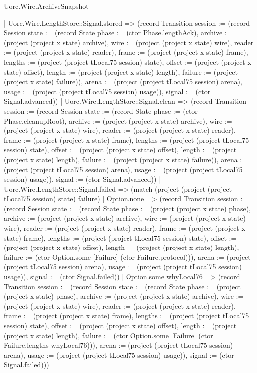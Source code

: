 \begin{lexlean}{Uorc.Wire.ArchiveSnapshot}
\begin{semanticmodule}
{        | Uorc.Wire.LengthStore::Signal.stored => (record Transition {session := (record Session {state := (record State {phase := (ctor Phase.lengthAck), archive := (project (project x state) archive), wire := (project (project x state) wire), reader := (project (project x state) reader), frame := (project (project x state) frame), lengths := (project (project tLocal75 session) state), offset := (project (project x state) offset), length := (project (project x state) length), failure := (project (project x state) failure)}), arena := (project (project tLocal75 session) arena), usage := (project (project tLocal75 session) usage)}), signal := (ctor Signal.advanced)})
        | Uorc.Wire.LengthStore::Signal.clean => (record Transition {session := (record Session {state := (record State {phase := (ctor Phase.cleanupRoot), archive := (project (project x state) archive), wire := (project (project x state) wire), reader := (project (project x state) reader), frame := (project (project x state) frame), lengths := (project (project tLocal75 session) state), offset := (project (project x state) offset), length := (project (project x state) length), failure := (project (project x state) failure)}), arena := (project (project tLocal75 session) arena), usage := (project (project tLocal75 session) usage)}), signal := (ctor Signal.advanced)})
        | Uorc.Wire.LengthStore::Signal.failed => (match (project (project (project tLocal75 session) state) failure)
          | Option.none => (record Transition {session := (record Session {state := (record State {phase := (project (project x state) phase), archive := (project (project x state) archive), wire := (project (project x state) wire), reader := (project (project x state) reader), frame := (project (project x state) frame), lengths := (project (project tLocal75 session) state), offset := (project (project x state) offset), length := (project (project x state) length), failure := (ctor Option.some [Failure] (ctor Failure.protocol))}), arena := (project (project tLocal75 session) arena), usage := (project (project tLocal75 session) usage)}), signal := (ctor Signal.failed)})
          | Option.some whyLocal76 => (record Transition {session := (record Session {state := (record State {phase := (project (project x state) phase), archive := (project (project x state) archive), wire := (project (project x state) wire), reader := (project (project x state) reader), frame := (project (project x state) frame), lengths := (project (project tLocal75 session) state), offset := (project (project x state) offset), length := (project (project x state) length), failure := (ctor Option.some [Failure] (ctor Failure.lengths whyLocal76))}), arena := (project (project tLocal75 session) arena), usage := (project (project tLocal75 session) usage)}), signal := (ctor Signal.failed)}))
}
\end{semanticmodule}
\end{lexlean}
